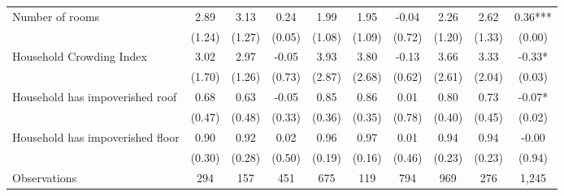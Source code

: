 \begin{tabular}{l*{9}c}
Number of rooms&2.89&3.13&0.24&1.99&1.95&-0.04&2.26&2.62&0.36***\\
&(1.24)&(1.27)&(0.05)&(1.08)&(1.09)&(0.72)&(1.20)&(1.33)&(0.00)\\
Household Crowding Index&3.02&2.97&-0.05&3.93&3.80&-0.13&3.66&3.33&-0.33*\\
&(1.70)&(1.26)&(0.73)&(2.87)&(2.68)&(0.62)&(2.61)&(2.04)&(0.03)\\
Household has impoverished roof&0.68&0.63&-0.05&0.85&0.86&0.01&0.80&0.73&-0.07*\\
&(0.47)&(0.48)&(0.33)&(0.36)&(0.35)&(0.78)&(0.40)&(0.45)&(0.02)\\
Household has impoverished floor&0.90&0.92&0.02&0.96&0.97&0.01&0.94&0.94&-0.00\\
&(0.30)&(0.28)&(0.50)&(0.19)&(0.16)&(0.46)&(0.23)&(0.23)&(0.94)\\
\hline
Observations & 294 & 157 & 451 & 675 & 119 & 794 & 969 & 276 & 1,245 \\
\hline\hline
\end{tabular}

